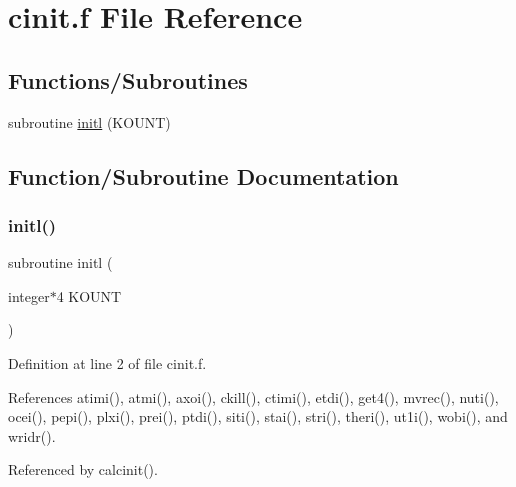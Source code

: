 \hypertarget{cinit_8f}{}\section{cinit.\+f File Reference}
\label{cinit_8f}
\subsection*{Functions/\+Subroutines}
\begin{DoxyCompactItemize}
\item 
subroutine \hyperlink{cinit_8f_a326a56f25d0f61eb654248a72d9b0575}{initl} (K\+O\+U\+NT)
\end{DoxyCompactItemize}


\subsection{Function/\+Subroutine Documentation}
\mbox{\label{cinit_8f_a326a56f25d0f61eb654248a72d9b0575}} 
\subsubsection{\texorpdfstring{initl()}{initl()}}
{\footnotesize\ttfamily subroutine initl (\begin{DoxyParamCaption}\item[{integer$\ast$4}]{K\+O\+U\+NT }\end{DoxyParamCaption})}



Definition at line 2 of file cinit.\+f.



References atimi(), atmi(), axoi(), ckill(), ctimi(), etdi(), get4(), mvrec(), nuti(), ocei(), pepi(), plxi(), prei(), ptdi(), siti(), stai(), stri(), theri(), ut1i(), wobi(), and wridr().



Referenced by calcinit().

